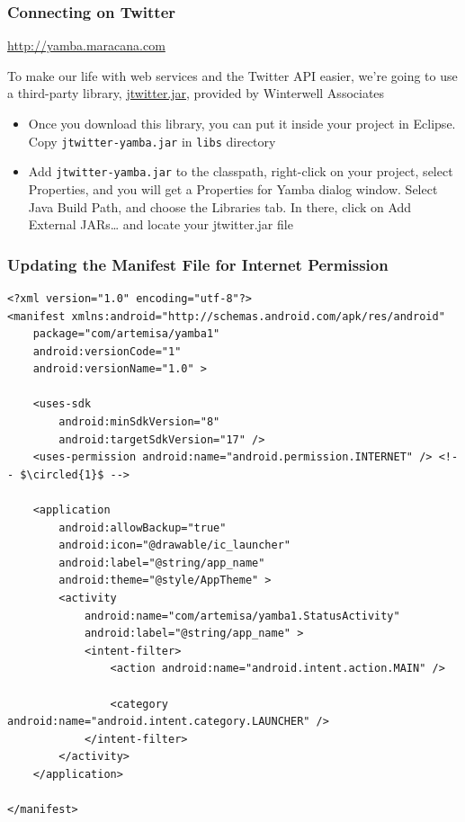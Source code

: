 \begin{frame}[fragile]
\frametitle{Connecting on Twitter}
\url{http://yamba.maracana.com}

To make our life with web services and the Twitter API easier, we’re going to use a
third-party library, \href{http://www.winterwell.com/software/jtwitter.php}{jtwitter.jar}, provided by Winterwell Associates

\begin{itemize}
 \item Once you download this library, you can put it inside your project in Eclipse. Copy \texttt{jtwitter-yamba.jar} in \texttt{libs} directory
 \item Add \texttt{jtwitter-yamba.jar} to the \alert{classpath}, right-click on your project, select Properties, and you will get a Properties for Yamba
dialog window. Select Java Build Path, and choose the Libraries tab. In there, click on Add External JARs… and locate your jtwitter.jar file

\end{itemize}

\end{frame}
\begin{frame}[fragile]
\frametitle{Updating the Manifest File for Internet Permission}
\lstset{language=XML, style=eclipse}
\begin{adjustbox}{width=0.75 \textwidth}
\centering
\begin{lstlisting}[caption=AndroidManifest.xml,basicstyle=\tiny, escapechar=$]
<?xml version="1.0" encoding="utf-8"?>
<manifest xmlns:android="http://schemas.android.com/apk/res/android"
    package="com/artemisa/yamba1"
    android:versionCode="1"
    android:versionName="1.0" >

    <uses-sdk
        android:minSdkVersion="8"
        android:targetSdkVersion="17" />
    <uses-permission android:name="android.permission.INTERNET" /> <!-- $\circled{1}$ -->
	
    <application
        android:allowBackup="true"
        android:icon="@drawable/ic_launcher"
        android:label="@string/app_name"
        android:theme="@style/AppTheme" >
        <activity
            android:name="com/artemisa/yamba1.StatusActivity"
            android:label="@string/app_name" >
            <intent-filter>
                <action android:name="android.intent.action.MAIN" />

                <category android:name="android.intent.category.LAUNCHER" />
            </intent-filter>
        </activity>
    </application>

</manifest>
\end{lstlisting}
\end{adjustbox}
\end{frame}

